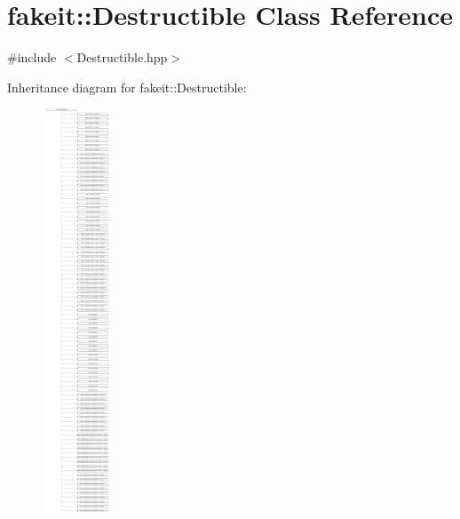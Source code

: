 \hypertarget{classfakeit_1_1Destructible}{}\section{fakeit\+::Destructible Class Reference}
\label{classfakeit_1_1Destructible}


{\ttfamily \#include $<$Destructible.\+hpp$>$}

Inheritance diagram for fakeit\+::Destructible\+:\begin{figure}[H]
\begin{center}
\leavevmode
\includegraphics[height=12.000000cm]{classfakeit_1_1Destructible}
\end{center}
\end{figure}

